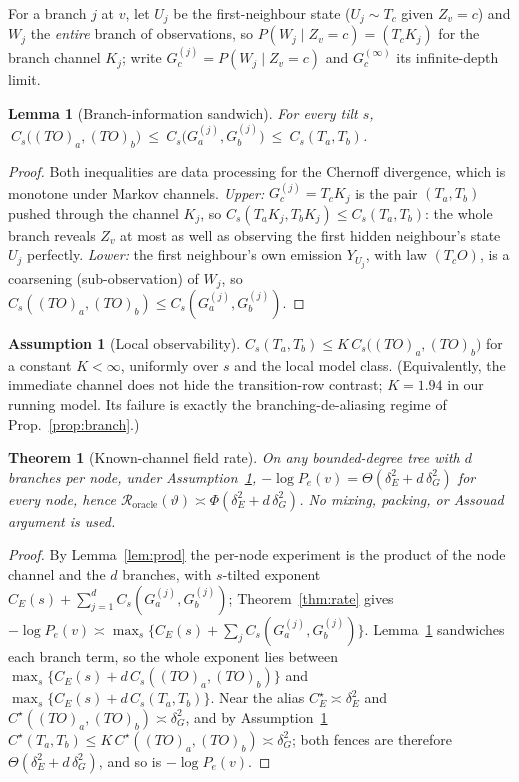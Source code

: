\documentclass[11pt]{article}
\theoremstyle{plain}
\newtheorem{theorem}{Theorem}\newtheorem{proposition}{Proposition}\newtheorem{corollary}{Corollary}
\newtheorem{lemma}{Lemma}
\theoremstyle{definition}\newtheorem{assumption}{Assumption}\newtheorem{remark}{Remark}
\begin{document}
For a branch $j$ at $v$, let $U_j$ be the first-neighbour state ($U_j\sim T_c$ given $Z_v{=}c$) and $W_j$ the
\emph{entire} branch of observations, so $P(W_j\mid Z_v{=}c)=(T_c K_j)$ for the branch channel $K_j$; write
$G_c^{(j)}=P(W_j\mid Z_v{=}c)$ and $G_c^{(\infty)}$ its infinite-depth limit.
\begin{lemma}[Branch-information sandwich]\label{lem:sandwich}
For every tilt $s$, $\ C_s\big((TO)_a,(TO)_b\big)\ \le\ C_s\big(G_a^{(j)},G_b^{(j)}\big)\ \le\ C_s(T_a,T_b)$.
\end{lemma}
\begin{proof}
Both inequalities are data processing for the Chernoff divergence, which is monotone under Markov channels.
\emph{Upper:} $G_c^{(j)}=T_cK_j$ is the pair $(T_a,T_b)$ pushed through the channel $K_j$, so
$C_s(T_aK_j,T_bK_j)\le C_s(T_a,T_b)$: the whole branch reveals $Z_v$ at most as well as observing the first hidden
neighbour's state $U_j$ perfectly. \emph{Lower:} the first neighbour's own emission $Y_{U_j}$, with law $(T_cO)$,
is a coarsening (sub-observation) of $W_j$, so $C_s((TO)_a,(TO)_b)\le C_s(G_a^{(j)},G_b^{(j)})$.
\end{proof}
\begin{assumption}[Local observability]\label{ass:obs}
$C_s(T_a,T_b)\le K\,C_s\big((TO)_a,(TO)_b\big)$ for a constant $K<\infty$, uniformly over $s$ and the local model
class. (Equivalently, the immediate channel does not hide the transition-row contrast; $K=1.94$ in our running
model. Its failure is exactly the branching-de-aliasing regime of Prop.~\ref{prop:branch}.)
\end{assumption}
\begin{theorem}[Known-channel field rate]\label{thm:field-rate}
On \emph{any} bounded-degree tree with $d$ branches per node, under Assumption~\ref{ass:obs},
$-\log P_e(v)=\Theta(\delta_E^2+d\,\delta_G^2)$ for every node, hence
$\mathcal R_{\mathrm{oracle}}(\vartheta)\asymp\Phi(\delta_E^2+d\,\delta_G^2)$. No mixing, packing, or Assouad
argument is used.
\end{theorem}
\begin{proof}
By Lemma~\ref{lem:prod} the per-node experiment is the product of the node channel and the $d$ branches, with
$s$-tilted exponent $C_E(s)+\sum_{j=1}^d C_s(G_a^{(j)},G_b^{(j)})$; Theorem~\ref{thm:rate} gives $-\log P_e(v)
\asymp\max_s\{C_E(s)+\sum_j C_s(G_a^{(j)},G_b^{(j)})\}$. Lemma~\ref{lem:sandwich} sandwiches each branch term,
so the whole exponent lies between $\max_s\{C_E(s)+d\,C_s((TO)_a,(TO)_b)\}$ and $\max_s\{C_E(s)+d\,C_s(T_a,T_b)\}$.
Near the alias $C_E^\star\asymp\delta_E^2$ and $C^\star((TO)_a,(TO)_b)\asymp\delta_G^2$, and by
Assumption~\ref{ass:obs} $C^\star(T_a,T_b)\le K\,C^\star((TO)_a,(TO)_b)\asymp\delta_G^2$; both fences are therefore
$\Theta(\delta_E^2+d\,\delta_G^2)$, and so is $-\log P_e(v)$.
\end{proof}
\end{document}
